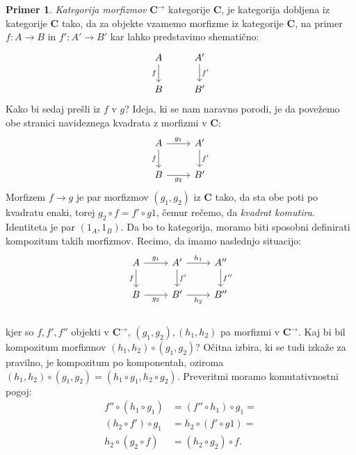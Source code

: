 \documentclass[12pt,a4paper]{book}
\theoremstyle{definition}
\theoremstyle{plain}
\theoremstyle{definition}
\newtheorem{primer}{Primer}[section]
\theoremstyle{remark}
\newcommand{\cat}[1]{\textbf{#1}}
\begin{document}
\begin{primer}
\emph{Kategorija morfizmov} $\cat{C}^{\rightarrow}$ kategorije $\cat{C}$, je kategorija dobljena iz kategorije $\cat{C}$ tako, da za objekte vzamemo morfizme iz kategorije $\cat{C}$, na primer $f : A \to B$ in $f' : A' \to B'$ kar lahko predstavimo shematično:
\[ \begin{tikzcd}
A \arrow[d, "f"'] & A' \arrow[d, "f'"] \\
B & B'
\end{tikzcd} \]
Kako bi sedaj prešli iz $f$ v $g$? Ideja, ki se nam naravno porodi, je da povežemo obe stranici navideznega kvadrata z morfizmi v $\cat{C}$:
\[ \begin{tikzcd}
A \arrow[d, "f"'] \arrow[r, "g_1"] & A' \arrow[d, "f'"] \\
B \arrow[r, "g_2"'] & B'
\end{tikzcd} \]
Morfizem $f \to g$ je par morfizmov $(g_1, g_2)$ iz $\cat{C}$ tako, da sta obe poti po kvadratu enaki, torej $g_2 \circ f = f' \circ g1$, čemur rečemo, da \emph{kvadrat komutira}.
Identiteta je par $(1_A, 1_B)$.
Da bo to kategorija, moramo biti sposobni definirati kompozitum takih morfizmov.
Recimo, da imamo naslednjo situacijo:
%
$$\begin{tikzcd}
A \arrow[d, "f"'] \arrow[r, "g_1"] & A' \arrow[d, "f'"] \arrow[r, "h_1"] & A'' \arrow[d, "f''"] \\
B \arrow[r, "g_2"'] & B' \arrow[r, "h_2"'] & B'' \\
\end{tikzcd}$$
%
kjer so $f, f', f''$ objekti v $\cat{C}^{\rightarrow}$, $(g_1, g_2), (h_1,h_2)$ pa morfizmi v $\cat{C}^{\rightarrow}$. Kaj bi bil kompozitum morfizmov $(h_1,h_2) \circ (g_1,g_2)$? Očitna izbira, ki se tudi izkaže za pravilno, je kompozitum po komponentah, oziroma $(h_1,h_2) \circ (g_1,g_2) = (h_1 \circ g_1, h_2 \circ g_2)$. Preveritmi moramo komutativnostni pogoj:
\begin{align*}
f'' \circ (h_1 \circ g_1) &= (f'' \circ h_1) \circ g_1 = \\
(h_2 \circ f') \circ g_1 &= h_2 \circ (f' \circ g1) = \\
h_2 \circ (g_2 \circ f) &= (h_2 \circ g_2) \circ f.
\end{align*}

\end{primer}
\end{document}
